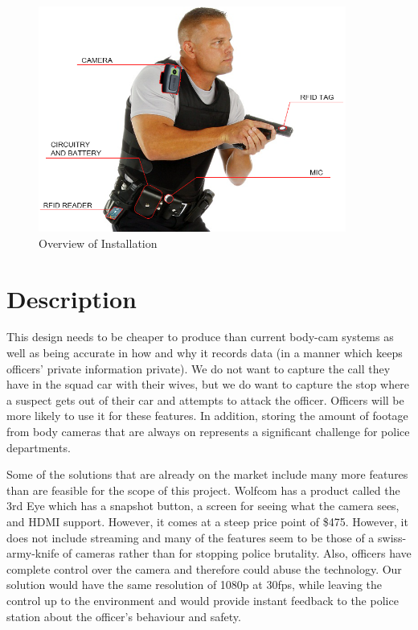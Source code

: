 \documentclass[12pt]{article}
\begin{document}
\begin{figure}[h!]
    \centering
    \includegraphics[width=0.9\textwidth]{installation}
    \caption{Overview of Installation}
    \label{fig:installation}
\end{figure}

\section{Description}

This design needs to be cheaper to produce than current body-cam systems as
well as being accurate in how and why it records data (in a manner which keeps
officers' private information private). We do not want to capture the call they
have in the squad car with their wives, but we do want to capture the stop
where a suspect gets out of their car and attempts to attack the officer.
Officers will be more likely to use it for these features. In addition, storing
the amount of footage from body cameras that are always on represents a significant
challenge for police departments\cite{store1,store2}.

Some of the solutions that are already on the market include many more features
than are feasible for the scope of this project. Wolfcom has a product called
the 3rd Eye\cite{third_eye} which has a snapshot button, a screen for seeing
what the camera sees, and HDMI support. However, it comes at a steep price
point of \$475.  However, it does not include streaming and many of the
features seem to be those of a swiss-army-knife of cameras rather than for
stopping police brutality. Also, officers have complete control over the camera
and therefore could abuse the technology. Our solution would have the same
resolution of 1080p at 30fps, while leaving the control up to the environment
and would provide instant feedback to the police station about the officer's
behaviour and safety.
\end{document}

